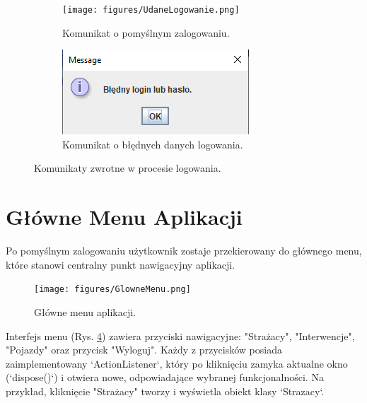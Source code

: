 \begin{figure}[H]
	\centering
	\begin{subfigure}{0.48\textwidth}
		\centering
		\texttt{[image: figures/UdaneLogowanie.png]}
		\caption{Komunikat o pomyślnym zalogowaniu.}
		\label{fig:logowanie_sukces}
	\end{subfigure}
	\hfill
	\begin{subfigure}{0.48\textwidth}
		\centering
		\includegraphics[width=\linewidth]{figures/BladLogowania.png}
		\caption{Komunikat o błędnych danych logowania.}
		\label{fig:logowanie_blad}
	\end{subfigure}
	\caption{Komunikaty zwrotne w procesie logowania.}
	\label{fig:komunikaty_logowania}
\end{figure}

\section{Główne Menu Aplikacji}
\label{sec:glowne_menu}

Po pomyślnym zalogowaniu użytkownik zostaje przekierowany do głównego menu, które stanowi centralny punkt nawigacyjny aplikacji.

\begin{figure}[H]
	\centering
	\texttt{[image: figures/GlowneMenu.png]}
	\caption{Główne menu aplikacji.}
	\label{fig:menu}
\end{figure}

Interfejs menu (Rys. \ref{fig:menu}) zawiera przyciski nawigacyjne: "Strażacy", "Interwencje", "Pojazdy" oraz przycisk "Wyloguj". Każdy z przycisków posiada zaimplementowany `ActionListener`, który po kliknięciu zamyka aktualne okno (`dispose()`) i otwiera nowe, odpowiadające wybranej funkcjonalności. Na przykład, kliknięcie "Strażacy" tworzy i wyświetla obiekt klasy `Strazacy`.
